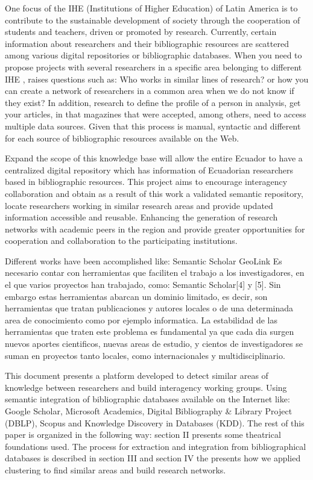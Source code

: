 \documentclass[11pt]{article}
\begin{document}
One focus of the IHE  (Institutions of Higher Education) of Latin America is to contribute to the sustainable development of society through the cooperation of students and teachers, driven or promoted  by research. Currently, certain information about researchers and their bibliographic resources are scattered among various digital repositories or bibliographic databases. When you need to propose projects with several researchers in a specific area belonging to different IHE  , raises questions such as: Who works in similar lines of research? or how you can create a network of researchers in a common area when we do not know if they exist? In addition, research to define the profile of a person in analysis, get your articles, in that magazines that were accepted, among others, need to access multiple data sources. Given that this process is manual, syntactic and different for each source of bibliographic resources available on the Web.

Expand the scope of this knowledge base will allow the entire Ecuador to have a centralized digital repository which has information of Ecuadorian researchers based in bibliographic resources. This project aims to encourage interagency collaboration and obtain as a result of this work a validated semantic repository, locate researchers working in similar research areas and provide updated information accessible and reusable. Enhancing the generation of research networks with academic peers in the region and provide greater opportunities for cooperation and collaboration to the participating institutions.


Different works have been accomplished like: 
Semantic Scholar
GeoLink
Es necesario contar con herramientas que faciliten el trabajo a los investigadores, en el que varios proyectos han trabajado, como: Semantic Scholar[4] y [5]. Sin embargo estas herramientas abarcan un dominio limitado, es decir, son herramientas que tratan publicaciones y autores locales o de una determinada area de conocimiento como por ejemplo informatica.  La estabilidad de las herramientas que traten este problema es fundamental ya que cada dia surgen nuevos aportes cientificos, nuevas areas de estudio, y cientos de investigadores se suman en proyectos tanto locales, como internacionales y multidisciplinario.  

This document presents a platform developed to detect similar areas of knowledge between  researchers and build interagency working groups. Using semantic integration of bibliographic databases available on the Internet like: Google Scholar, Microsoft Academics, Digital Bibliography \& Library Project (DBLP), Scopus and Knowledge Discovery in Databases (KDD). The rest of this paper is organized in the following way: section II presents some theatrical foundations used. The process for extraction and integration from bibliographical databases is described in section III and section IV the presents how we applied clustering to find similar areas and build research networks. 
\end{document}

